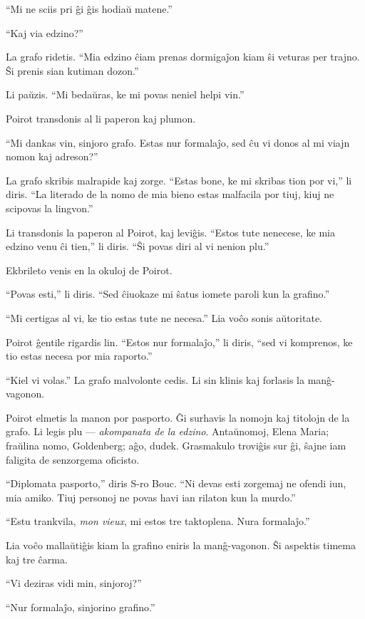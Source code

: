 ``Mi ne sciis pri ĝi ĝis hodiaŭ matene.''

``Kaj via edzino?''

La grafo ridetis. ``Mia edzino ĉiam prenas dormigaĵon kiam ŝi veturas per trajno. Ŝi prenis sian kutiman dozon.''

Li paŭzis. ``Mi bedaŭras, ke mi povas neniel helpi vin.''

Poirot transdonis al li paperon kaj plumon.

``Mi dankas vin, sinjoro grafo. Estas nur formalaĵo, sed ĉu vi donos al mi viajn nomon kaj adreson?''

La grafo skribis malrapide kaj zorge. ``Estas bone, ke mi skribas tion por vi,'' li diris. ``La literado de la nomo de mia bieno estas malfacila por tiuj, kiuj ne scipovas la lingvon.''

Li transdonis la paperon al Poirot, kaj leviĝis. ``Estos tute nenecese, ke mia edzino venu ĉi tien,'' li diris. ``Ŝi povas diri al vi nenion plu.''

Ekbrileto venis en la okuloj de Poirot.

``Povas esti,'' li diris. ``Sed ĉiuokaze mi ŝatus iomete paroli kun la grafino.''

``Mi certigas al vi, ke tio estas tute ne necesa.'' Lia voĉo sonis aŭtoritate.

Poirot ĝentile rigardis lin. ``Estos nur formalaĵo,'' li diris, ``sed vi komprenos, ke tio estas necesa por mia raporto.''

``Kiel vi volas.'' La grafo malvolonte cedis. Li sin klinis kaj forlasis la manĝ-vagonon.

Poirot elmetis la manon por pasporto. Ĝi surhavis la nomojn kaj titolojn de la grafo. Li legis plu --- \emph{akompanata de la edzino}. Antaŭnomoj, Elena Maria; fraŭlina nomo, Goldenberg; aĝo, dudek. Grasmakulo troviĝis sur ĝi, ŝajne iam faligita de senzorgema oficisto.

``Diplomata pasporto,'' diris S-ro Bouc. ``Ni devas esti zorgemaj ne ofendi iun, mia amiko. Tiuj personoj ne povas havi ian rilaton kun la murdo.''

``Estu trankvila, \emph{mon vieux}, mi estos tre taktoplena. Nura formalaĵo.''

Lia voĉo mallaŭtiĝis kiam la grafino eniris la manĝ-vagonon. Ŝi aspektis timema kaj tre ĉarma.

``Vi deziras vidi min, sinjoroj?''

``Nur formalaĵo, sinjorino grafino.''

